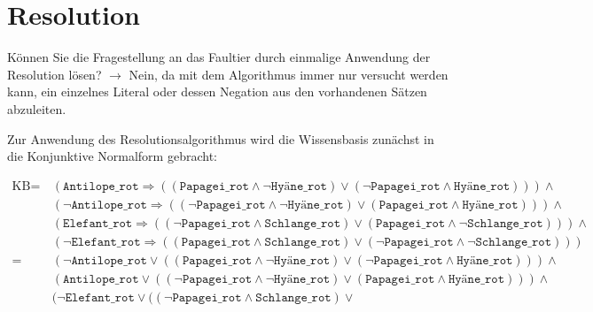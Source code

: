 \documentclass[a4paper,draft=false,oneside,12pt,ngerman]{scrreprt}
\begin{document}
\section{Resolution}
\label{sec:resolution}

Können Sie die Fragestellung an das Faultier durch einmalige Anwendung der
Resolution lösen? $\rightarrow$ Nein, da mit dem Algorithmus immer nur versucht
werden kann, ein einzelnes Literal oder dessen Negation aus den vorhandenen
Sätzen abzuleiten.

Zur Anwendung des Resolutionsalgorithmus wird die Wissensbasis zunächst in die
Konjunktive Normalform gebracht:

\begin{align*}
    \text{KB} =\, &
            (\texttt{Antilope\_rot} \Rightarrow (
                (\texttt{Papagei\_rot} \land \neg \texttt{Hyäne\_rot}) \lor
                (\neg \texttt{Papagei\_rot} \land \texttt{Hyäne\_rot})
                )
            ) \land \\ &
            (\neg \texttt{Antilope\_rot} \Rightarrow (
                (\neg \texttt{Papagei\_rot} \land \neg\texttt{Hyäne\_rot}) \lor
                (\texttt{Papagei\_rot} \land \texttt{Hyäne\_rot})
                )
            ) \land \\ &
            (\texttt{Elefant\_rot} \Rightarrow (
                (\neg \texttt{Papagei\_rot} \land \texttt{Schlange\_rot}) \lor
                (\texttt{Papagei\_rot} \land \neg \texttt{Schlange\_rot})
                )
            ) \land \\ &
            (\neg \texttt{Elefant\_rot} \Rightarrow (
                (\texttt{Papagei\_rot} \land \texttt{Schlange\_rot}) \lor
                (\neg \texttt{Papagei\_rot} \land \neg \texttt{Schlange\_rot})
                )
            ) \\
        =\, & 
            (\neg \texttt{Antilope\_rot} \lor (
                (\texttt{Papagei\_rot} \land \neg \texttt{Hyäne\_rot}) \lor
                (\neg \texttt{Papagei\_rot} \land \texttt{Hyäne\_rot})
                )
            ) \land \\ &
            (\texttt{Antilope\_rot} \lor (
                (\neg \texttt{Papagei\_rot} \land \neg\texttt{Hyäne\_rot}) \lor
                (\texttt{Papagei\_rot} \land \texttt{Hyäne\_rot})
                )
            ) \land \\ &
            (\neg \texttt{Elefant\_rot} \lor (
                (\neg \texttt{Papagei\_rot} \land \texttt{Schlange\_rot}) \lor

\end{align*}
\end{document}
